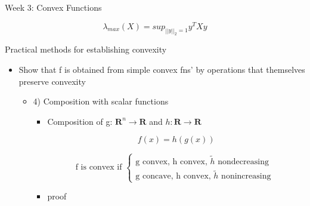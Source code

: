 \documentclass{article}
\begin{document}
\begin{homeworkProblemName}{{\LARGE Week 3: Convex Functions}}
\begin{problemAnswer}
{\begin{itemize}
\begin{itemize}
\begin{itemize}
\begin{itemize}
              $$ \lambda_{max}(X) = sup_{||y||_2 = 1} y^TXy $$
          \end{itemize}
        \end{itemize}
      \end{itemize}
    \end{itemize}
  }\end{problemAnswer}

\newpage

\begin{problemAnswer}{

    Practical methods for establishing convexity

    \begin{itemize}
    \item Show that f is obtained from simple convex fns' by operations that
      themselves preserve convexity

      \begin{itemize}
      \item 4) Composition with scalar functions
        \begin{itemize}
        \item Composition of g: $\bm{R}^n \rightarrow \bm{R}$ and $h: \bm{R} \rightarrow \bm{R}$

          $$ f(x) = h(g(x))$$

          \[ \text{f is convex if } \begin{cases}
             \text{g convex, h convex, $\tilde{h}$ nondecreasing } \\
             \text{g concave, h convex, $\tilde{h}$ nonincreasing }
            \end{cases}
          \]

        \item proof

        \end{itemize}
      \end{itemize}
    \end{itemize}

}\end{problemAnswer}
\end{homeworkProblemName}
\end{document}
